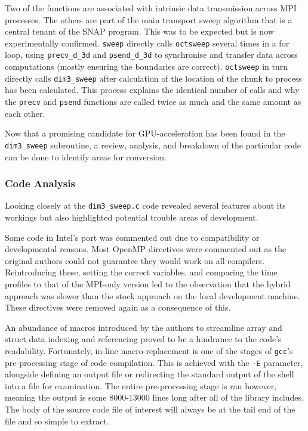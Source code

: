\documentclass[conference]{IEEEtran}
\begin{document}
Two of the functions are associated with intrinsic data transmission across MPI processes. The others are part of the main transport sweep algorithm that is a central tenant of the SNAP program. This was to be expected but is now experimentally confirmed. \texttt{sweep} directly calls \texttt{octsweep} several times in a for loop, using \texttt{precv\_d\_3d} and \texttt{psend\_d\_3d} to synchronise and transfer data across computations (mostly ensuring the boundaries are correct). \texttt{octsweep} in turn directly calls \texttt{dim3\_sweep} after calculation of the location of the chunk to process has been calculated. This process explains the identical number of calls and why the \texttt{precv} and \texttt{psend} functions are called twice as much and the same amount as each other.

Now that a promising candidate for GPU-acceleration has been found in the \texttt{dim3\_sweep} subroutine, a review, analysis, and breakdown of the particular code can be done to identify areas for conversion.


\subsubsection{Code Analysis}
\label{subsec:inv_codeanalysis}

Looking closely at the \texttt{dim3\_sweep.c} code revealed several features about its workings but also highlighted potential trouble areas of development.

Some code in Intel's port was commented out due to compatibility or developmental reasons. Most OpenMP directives were commented out as the original authors could not guarantee they would work on all compilers. Reintroducing these, setting the correct variables, and comparing the time profiles to that of the MPI-only version led to the observation that the hybrid approach was slower than the stock approach on the local development machine. These directives were removed again as a consequence of this.

An abundance of macros introduced by the authors to streamline array and struct data indexing and referencing proved to be a hindrance to the code's readability. Fortunately, in-line macro-replacement is one of the stages of \texttt{gcc}'s pre-processing stage of code compilation. This is achieved with the \texttt{-E} parameter, alongside defining an output file or redirecting the standard output of the shell into a file for examination. The entire pre-processing stage is ran however, meaning the output is some 8000-13000 lines long after all of the library includes. The body of the source code file of interest will always be at the tail end of the file and so simple to extract.
\end{document}
